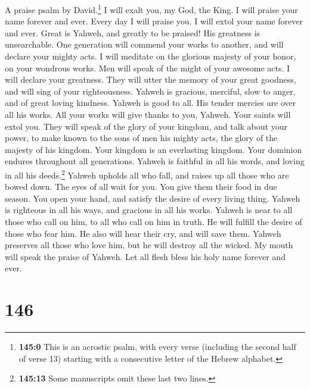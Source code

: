 A praise psalm by David.\footnote{\textbf{145:0} This is an acrostic
  psalm, with every verse (including the second half of verse 13)
  starting with a consecutive letter of the Hebrew alphabet.}
 I will exalt you, my God, the King. I will praise your
name forever and ever.  Every day I will praise you. I
will extol your name forever and ever.  Great is Yahweh,
and greatly to be praised! His greatness is unsearchable. 
One generation will commend your works to another, and will declare your
mighty acts.  I will meditate on the glorious majesty of
your honor, on your wondrous works.  Men will speak of the
might of your awesome acts. I will declare your greatness.
 They will utter the memory of your great goodness, and
will sing of your righteousness.  Yahweh is gracious,
merciful, slow to anger, and of great loving kindness. 
Yahweh is good to all. His tender mercies are over all his works.
 All your works will give thanks to you, Yahweh. Your
saints will extol you.  They will speak of the glory of
your kingdom, and talk about your power,  to make known
to the sons of men his mighty acts, the glory of the majesty of his
kingdom.  Your kingdom is an everlasting kingdom. Your
dominion endures throughout all generations. Yahweh is faithful in all
his words, and loving in all his deeds.\footnote{\textbf{145:13} Some
  manuscripts omit these last two lines.}  Yahweh upholds
all who fall, and raises up all those who are bowed down.
 The eyes of all wait for you. You give them their food
in due season.  You open your hand, and satisfy the
desire of every living thing.  Yahweh is righteous in all
his ways, and gracious in all his works.  Yahweh is near
to all those who call on him, to all who call on him in truth.
 He will fulfill the desire of those who fear him. He
also will hear their cry, and will save them.  Yahweh
preserves all those who love him, but he will destroy all the wicked.
 My mouth will speak the praise of Yahweh. Let all flesh
bless his holy name forever and ever.

\hypertarget{section-138}{%
\section{146}\label{section-138}}

